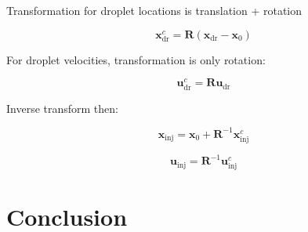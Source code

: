 Transformation for droplet locations is translation + rotation

\begin{equation}
\boldsymbol{x}^c_\mathrm{dr} = \boldsymbol{R} \left( \boldsymbol{x}_\mathrm{dr} -  \boldsymbol{x}_0 \right)
\end{equation}

For droplet velocities, transformation is only rotation:

\begin{equation}
\boldsymbol{u}^c_\mathrm{dr} = \boldsymbol{R} \boldsymbol{u}_\mathrm{dr}
\end{equation}

Inverse transform then:

\begin{equation}
\boldsymbol{x}_\mathrm{inj} = \boldsymbol{x}_0 + \boldsymbol{R}^{-1} \boldsymbol{x}_\mathrm{inj}^c
\end{equation}

\begin{equation}
\boldsymbol{u}_\mathrm{inj} = \boldsymbol{R}^{-1} \boldsymbol{u}_\mathrm{inj}^c
\end{equation}

\section{Conclusion}
